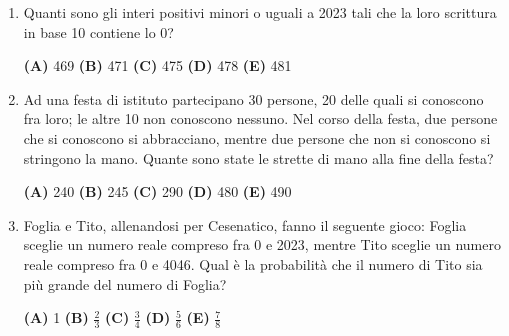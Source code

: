 \documentclass{article}
\begin{document}
\pagestyle{fancy}
\fancyhf{}

\begin{enumerate}
	\item Quanti sono gli interi positivi minori o uguali a 2023 tali che
		la loro scrittura in base 10 contiene lo 0?

		\vspace{0.15cm}
		\textbf{(A)} 469 \hspace{0.5cm}
		\textbf{(B)} 471 \hspace{0.5cm}
		\textbf{(C)} 475 \hspace{0.5cm}
		\textbf{(D)} 478 \hspace{0.5cm}
		\textbf{(E)} 481 \hspace{0.5cm}

	\item Ad una festa di istituto
		partecipano 30 persone, 20 delle quali si conoscono
		fra loro; le altre 10 non conoscono nessuno. Nel corso della festa,
		due persone che si conoscono si abbracciano, mentre due persone che
		non si conoscono si stringono la mano. Quante sono state le strette
		di mano alla fine della festa?

		\vspace{0.15cm}
		\textbf{(A)} 240 \hspace{0.5cm}
		\textbf{(B)} 245 \hspace{0.5cm}
		\textbf{(C)} 290 \hspace{0.5cm}
		\textbf{(D)} 480 \hspace{0.5cm}
		\textbf{(E)} 490 \hspace{0.5cm}
		
	\item Foglia e Tito, allenandosi per Cesenatico, fanno il seguente gioco:
		Foglia sceglie un numero reale compreso fra 0 e 2023, mentre
		Tito sceglie un numero reale compreso fra 0 e 4046. Qual è la
		probabilità che il numero di Tito sia più grande del numero
		di Foglia?

		\vspace{0.15cm}
		\textbf{(A)} 1 \hspace{0.5cm}
		\textbf{(B)} $\frac{2}{3}$ \hspace{0.5cm}
		\textbf{(C)} $\frac{3}{4}$ \hspace{0.5cm}
		\textbf{(D)} $\frac{5}{6}$ \hspace{0.5cm}
		\textbf{(E)} $\frac{7}{8}$ \hspace{0.5cm}


\end{enumerate}
\end{document}
